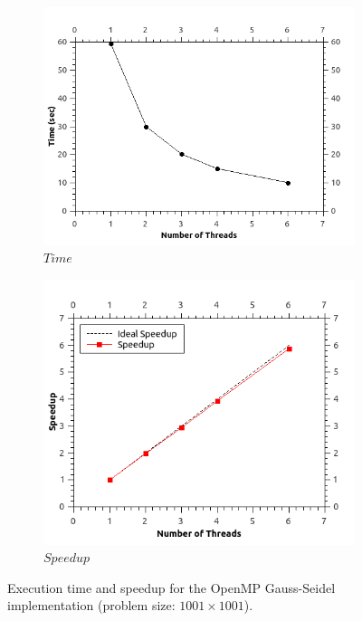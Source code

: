 \documentclass[11pt]{report}
\begin{document}
\begin{figure}[th!]
\centering
\begin{subfigure}{0.45\textwidth}
  \centering
  \includegraphics[width=1.0\linewidth]{images/sor_time_1001}
  \caption{$Time$}
\end{subfigure}
\begin{subfigure}{0.45\textwidth}
  \centering
  \includegraphics[width=1.0\linewidth]{images/sor_speedup_1001}
  \caption{$Speedup$}
\end{subfigure}
\caption{Execution time and speedup for the OpenMP Gauss-Seidel implementation (problem size: $1001 \times 1001$). }
\label{fig:example5.8}
\end{figure}
\newpage
\end{document}
